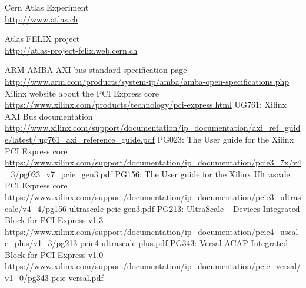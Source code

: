 \begin{thebibliography}{9}
  Cern Atlas Experiment\\
  \href{http://www.atlas.ch}{http://www.atlas.ch}

Atlas FELIX project\\
\href{http://atlas-project-felix.web.cern.ch}{http://atlas-project-felix.web.cern.ch}


  ARM AMBA AXI bus standard specification page\\
  \href{http://www.arm.com/products/system-ip/amba/amba-open-specifications.php}{http://www.arm.com/products/system-ip/amba/amba-open-specifications.php}
  Xilinx website about the PCI Express core\\
  \href{https://www.xilinx.com/products/technology/pci-express.html}{https://www.xilinx.com/products/technology/pci-express.html}
  UG761: Xilinx AXI Bus documentation\\
  \href{http://www.xilinx.com/support/documentation/ip_documentation/axi_ref_guide/latest/ug761_axi_reference_guide.pdf}{http://www.xilinx.com/support/documentation/ip\_documentation/axi\_ref\_guide/latest/ ug761\_axi\_reference\_guide.pdf}
  PG023: The User guide for the Xilinx PCI Express core\\
  \href{https://www.xilinx.com/support/documentation/ip\_documentation/pcie3\_7x/v4\_3/pg023\_v7\_pcie\_gen3.pdf}{https://www.xilinx.com/support/documentation/ip\_documentation/pcie3\_7x/v4\_3/pg023\_v7\_pcie\_gen3.pdf}
PG156: The User guide for the Xilinx Ultrascale PCI Express core \\
\href{https://www.xilinx.com/support/documentation/ip\_documentation/pcie3\_ultrascale/v4\_4/pg156-ultrascale-pcie-gen3.pdf}{https://www.xilinx.com/support/documentation/ip\_documentation/pcie3\_ultrascale/v4\_4/pg156-ultrascale-pcie-gen3.pdf}
PG213: UltraScale+ Devices Integrated Block for PCI Express v1.3 \href{https://www.xilinx.com/support/documentation/ip\_documentation/pcie4\_uscale\_plus/v1\_3/pg213-pcie4-ultrascale-plus.pdf}{https://www.xilinx.com/support/documentation/ip\_documentation/pcie4\_uscale\_plus/v1\_3/pg213-pcie4-ultrascale-plus.pdf}
PG343: Versal ACAP Integrated Block for PCI Express v1.0
\href{https://www.xilinx.com/support/documentation/ip\_documentation/pcie\_versal/v1\_0/pg343-pcie-versal.pdf}{https://www.xilinx.com/support/documentation/ip\_documentation/pcie\_versal/v1\_0/pg343-pcie-versal.pdf}

\end{thebibliography}
